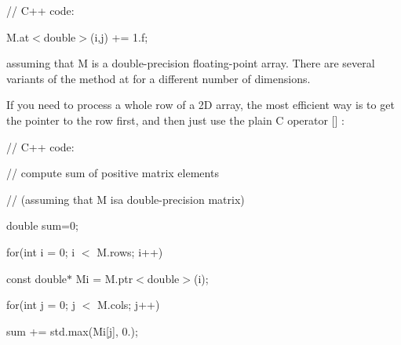 {\ttfamily }

{\ttfamily }

{\ttfamily // C++ code\+:}

{\ttfamily }

{\ttfamily }

{\ttfamily M.\+at$<$double$>$(i,j) += 1.\+f;}

{\ttfamily }

{\ttfamily }

{\ttfamily assuming that M is a double-\/precision floating-\/point array. There are several variants of the method {\ttfamily at} for a different number of dimensions. }

If you need to process a whole row of a 2D array, the most efficient way is to get the pointer to the row first, and then just use the plain C operator {\ttfamily \mbox{[}\mbox{]}} \+: {\ttfamily }

{\ttfamily }

{\ttfamily }

{\ttfamily // C++ code\+:}

{\ttfamily }

{\ttfamily }

{\ttfamily // compute sum of positive matrix elements}

{\ttfamily }

{\ttfamily }

{\ttfamily // (assuming that M isa double-\/precision matrix)}

{\ttfamily }

{\ttfamily }

{\ttfamily double sum=0;}

{\ttfamily }

{\ttfamily }

{\ttfamily for(int i = 0; i $<$ M.\+rows; i++)}

{\ttfamily }

{\ttfamily }

{\ttfamily const double$\ast$ Mi = M.\+ptr$<$double$>$(i);}

{\ttfamily }

{\ttfamily }

{\ttfamily for(int j = 0; j $<$ M.\+cols; j++)}

{\ttfamily }

{\ttfamily }

{\ttfamily sum += std.\+max(Mi\mbox{[}j\mbox{]}, 0.);}

{\ttfamily }

{\ttfamily }

